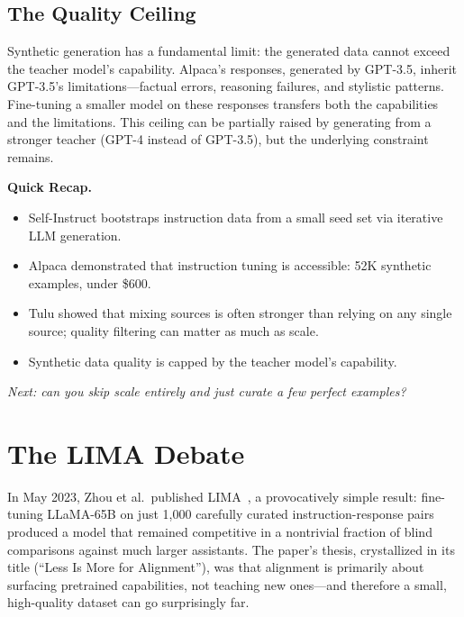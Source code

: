 \subsection{The Quality Ceiling}

Synthetic generation has a fundamental limit: the generated data cannot exceed the teacher model's capability. Alpaca's responses, generated by GPT-3.5, inherit GPT-3.5's limitations---factual errors, reasoning failures, and stylistic patterns. Fine-tuning a smaller model on these responses transfers both the capabilities and the limitations. This ceiling can be partially raised by generating from a stronger teacher (GPT-4 instead of GPT-3.5), but the underlying constraint remains.

\begin{quickrecap}
\textbf{Quick Recap.}
\begin{itemize}[nosep,leftmargin=1.5em]
  \item Self-Instruct bootstraps instruction data from a small seed set via iterative LLM generation.
  \item Alpaca demonstrated that instruction tuning is accessible: 52K synthetic examples, under \$600.
  \item Tulu showed that mixing sources is often stronger than relying on any single source; quality filtering can matter as much as scale.
  \item Synthetic data quality is capped by the teacher model's capability.
\end{itemize}
\textit{Next: can you skip scale entirely and just curate a few perfect examples?}
\end{quickrecap}


\section{The LIMA Debate}
\label{sec:lima-debate}

In May 2023, Zhou et al.\ published LIMA~\cite{zhou2023lima}, a provocatively simple result: fine-tuning LLaMA-65B on just 1{,}000 carefully curated instruction-response pairs produced a model that remained competitive in a nontrivial fraction of blind comparisons against much larger assistants. The paper's thesis, crystallized in its title (``Less Is More for Alignment''), was that alignment is primarily about surfacing pretrained capabilities, not teaching new ones---and therefore a small, high-quality dataset can go surprisingly far.

